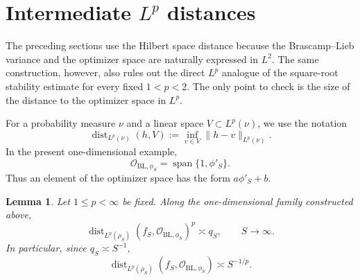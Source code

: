 \documentclass[11pt]{amsart}
\newtheorem{lemma}[theorem]{Lemma}
\theoremstyle{remark}
\DeclareMathOperator{\dist}{dist}
\DeclareMathOperator{\spanop}{span}
\newcommand{\cO}{\mathcal O}
\newcommand{\BL}{\mathrm{BL}}
\begin{document}
\section{Intermediate \texorpdfstring{$L^p$}{Lp} distances}

The preceding sections use the Hilbert space distance because the
Brascamp--Lieb variance and the optimizer space are naturally expressed in
$L^2$. The same construction, however, also rules out the direct $L^p$
analogue of the square-root stability estimate for every fixed $1<p<2$.
The only point to check is the size of the distance to the optimizer space in
$L^p$.

For a probability measure $\nu$ and a linear space $V\subset L^p(\nu)$, we use
the notation
\[
  \dist_{L^p(\nu)}(h,V)
  :=
  \inf_{v\in V}\|h-v\|_{L^p(\nu)}.
\]
In the present one-dimensional example,
\[
  \cO_{\BL,\phi_S}=\spanop\{1,\phi'_S\}.
\]
Thus an element of the optimizer space has the form $a\phi'_S+b$.

\begin{lemma}\label{lem:lp-distance-1d}
Let $1\le p<\infty$ be fixed. Along the one-dimensional family constructed
above,
\[
  \dist_{L^p(\rho_S)}(f_S,\cO_{\BL,\phi_S})^p
  \asymp q_S,
  \qquad S\to\infty.
\]
In particular, since $q_S\asymp S^{-1}$,
\[
  \dist_{L^p(\rho_S)}(f_S,\cO_{\BL,\phi_S})
  \asymp S^{-1/p}.
\]
\end{lemma}
\end{document}
